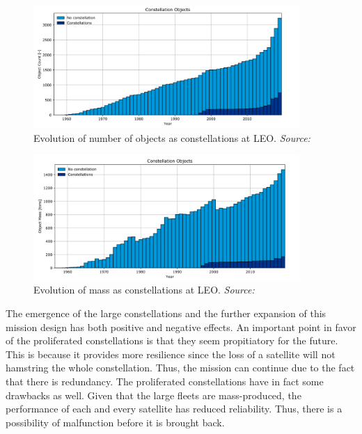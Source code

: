 \begin{figure}
\centering
\includegraphics[width=0.9\textwidth]{Images/constellation_count_LEO.png}\caption{Evolution of number of objects as constellations at LEO. \textit{Source: \cite{ESA 2020}}}
\label{constellation_count_LEO} 
\end{figure}

\begin{figure}
\centering
\includegraphics[width=0.9\textwidth]{Images/constellation_mass_LEO.png}\caption{Evolution of mass as constellations at LEO. \textit{Source: \cite{ESA 2020}}}
\label{constellation_mass_LEO} 
\end{figure}

The emergence of the large constellations and the further expansion of this mission design has both positive and negative effects. An important point in favor of the proliferated constellations is that they seem propitiatory for the future. This is because it provides more resilience since the loss of a satellite will not hamstring the whole constellation. Thus, the mission can continue due to the fact that there is redundancy. The proliferated constellations have in fact some drawbacks as well. Given that the large fleets are mass-produced, the performance of each and every satellite has reduced reliability. Thus, there is a possibility of malfunction before it is brought back. 

\bigskip
